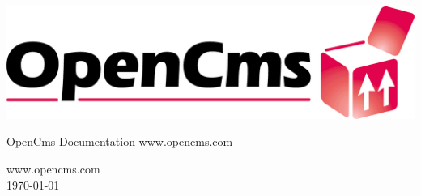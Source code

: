 
\begin{titlepage}
\begin{flushright}
  \includegraphics[width=0.4\linewidth]{pics/logo}
\end{flushright}
\vspace{8cm}
\Huge
\titleFont \underline{OpenCms Documentation}
\vfill
\normalsize
www.opencms.com
\end{titlepage}

\newpage
\thispagestyle{empty}
\vspace*{\fill}
www.opencms.com\\
\today


